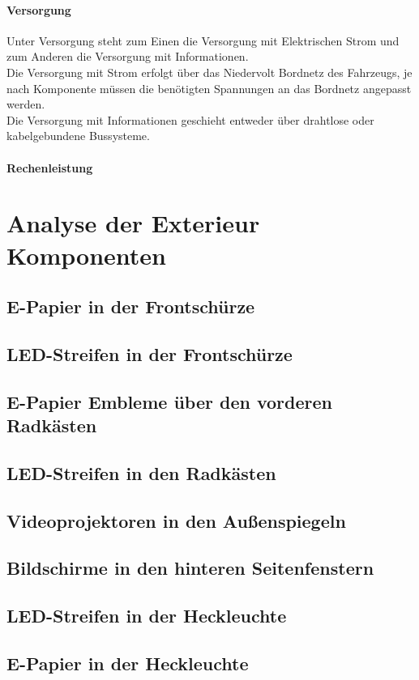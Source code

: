 \paragraph{Versorgung}
Unter Versorgung steht zum Einen die Versorgung mit Elektrischen Strom und zum Anderen die Versorgung mit Informationen.\\
Die Versorgung mit Strom erfolgt über das Niedervolt Bordnetz des Fahrzeugs, je nach Komponente müssen die benötigten Spannungen an das Bordnetz angepasst werden.\\
Die Versorgung mit Informationen geschieht entweder über drahtlose oder kabelgebundene Bussysteme.
\paragraph{Rechenleistung}

\section{Analyse der Exterieur Komponenten}
\subsection{E-Papier in der Frontschürze}
\subsection{LED-Streifen in der Frontschürze}
\subsection{E-Papier Embleme über den vorderen Radkästen}
\subsection{LED-Streifen in den Radkästen}
\subsection{Videoprojektoren in den Außenspiegeln}
\subsection{Bildschirme in den hinteren Seitenfenstern}
\subsection{LED-Streifen in der Heckleuchte}
\subsection{E-Papier in der Heckleuchte}
